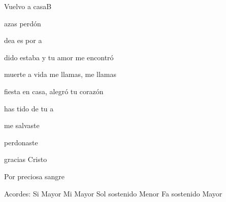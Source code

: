 \documentclass[12pt, spanish]{book}
\begin{document}
\begin{song}{Vuelvo a casa}{B}
\begin{SBOpGroup}
             azas   perdón

            dea es por  a
        \end{SBOpGroup}

        \begin{SBOpGroup}
            dido estaba y tu amor me encontró

             muerte a vida me llamas, me llamas

             fiesta en  casa,  alegró tu corazón

             has tido de tu a
        \end{SBOpGroup}


        \begin{SBOpGroup}
             me salvaste

             perdonaste

             gracias Cristo

            Por  preciosa sangre
        \end{SBOpGroup}

        \ifChordBk
        \begin{SBOpGroup}
            Acordes:\break
            \upchord{\B}\qquad\qquad Si Mayor \hfill
            \upchord{\E}\qquad Mi Mayor \hfill\null\break
            \upchord{\Gsm}\qquad Sol sostenido Menor \hfill
            \upchord{\Fs}Fa sostenido Mayor \hfill\null\break
        \end{SBOpGroup}
        \fi
    \end{song}
\end{document}
